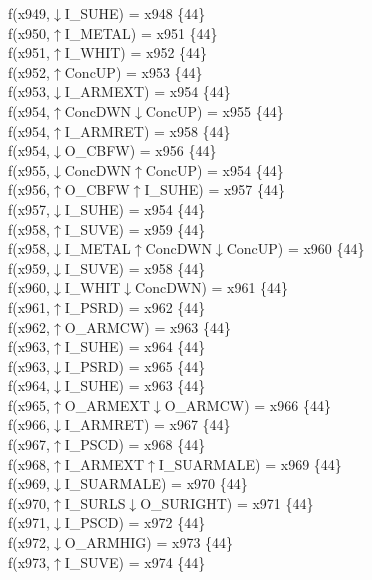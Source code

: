 f(x949,$\downarrow$I\_SUHE) = x948 \{44\} \\  
f(x950,$\uparrow$I\_METAL) = x951 \{44\} \\  
f(x951,$\uparrow$I\_WHIT) = x952 \{44\} \\  
f(x952,$\uparrow$ConcUP) = x953 \{44\} \\  
f(x953,$\downarrow$I\_ARMEXT) = x954 \{44\} \\  
f(x954,$\uparrow$ConcDWN$\downarrow$ConcUP) = x955 \{44\} \\  
f(x954,$\uparrow$I\_ARMRET) = x958 \{44\} \\  
f(x954,$\downarrow$O\_CBFW) = x956 \{44\} \\  
f(x955,$\downarrow$ConcDWN$\uparrow$ConcUP) = x954 \{44\} \\  
f(x956,$\uparrow$O\_CBFW$\uparrow$I\_SUHE) = x957 \{44\} \\  
f(x957,$\downarrow$I\_SUHE) = x954 \{44\} \\  
f(x958,$\uparrow$I\_SUVE) = x959 \{44\} \\  
f(x958,$\downarrow$I\_METAL$\uparrow$ConcDWN$\downarrow$ConcUP) = x960 \{44\} \\  
f(x959,$\downarrow$I\_SUVE) = x958 \{44\} \\  
f(x960,$\downarrow$I\_WHIT$\downarrow$ConcDWN) = x961 \{44\} \\  
f(x961,$\uparrow$I\_PSRD) = x962 \{44\} \\  
f(x962,$\uparrow$O\_ARMCW) = x963 \{44\} \\  
f(x963,$\uparrow$I\_SUHE) = x964 \{44\} \\  
f(x963,$\downarrow$I\_PSRD) = x965 \{44\} \\  
f(x964,$\downarrow$I\_SUHE) = x963 \{44\} \\  
f(x965,$\uparrow$O\_ARMEXT$\downarrow$O\_ARMCW) = x966 \{44\} \\  
f(x966,$\downarrow$I\_ARMRET) = x967 \{44\} \\  
f(x967,$\uparrow$I\_PSCD) = x968 \{44\} \\  
f(x968,$\uparrow$I\_ARMEXT$\uparrow$I\_SUARMALE) = x969 \{44\} \\  
f(x969,$\downarrow$I\_SUARMALE) = x970 \{44\} \\  
f(x970,$\uparrow$I\_SURLS$\downarrow$O\_SURIGHT) = x971 \{44\} \\  
f(x971,$\downarrow$I\_PSCD) = x972 \{44\} \\  
f(x972,$\downarrow$O\_ARMHIG) = x973 \{44\} \\  
f(x973,$\uparrow$I\_SUVE) = x974 \{44\} \\  
